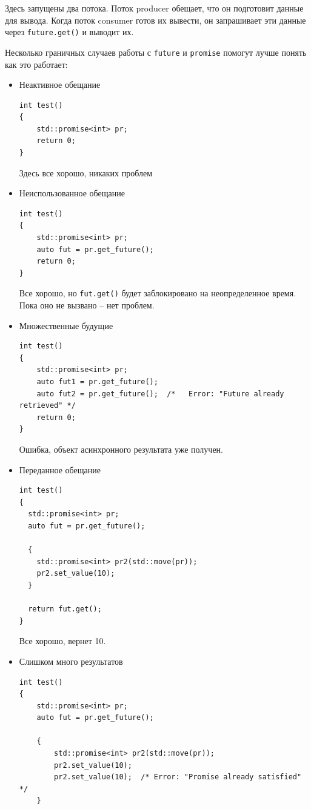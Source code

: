 \documentclass[a4paper,12pt,oneside]{article}
\begin{document}
Здесь запущены два потока. Поток producer обещает, что он подготовит данные для вывода. Когда поток consumer готов их вывести, он запрашивает эти данные через \lstinline!future.get()! и выводит их.

Несколько граничных случаев работы с \lstinline!future! и \lstinline!promise! помогут лучше понять как это работает:

\begin{itemize}
\item Неактивное обещание
\begin{lstlisting}
int test()
{
    std::promise<int> pr;
    return 0;
}
\end{lstlisting}

Здесь все хорошо, никаких проблем

\item Неиспользованное обещание
\begin{lstlisting}
int test()
{
    std::promise<int> pr;
    auto fut = pr.get_future();
    return 0;
}
\end{lstlisting}

Все хорошо, но \lstinline!fut.get()! будет заблокировано на неопределенное время. Пока оно не вызвано -- нет проблем.

\item Множественные будущие
\begin{lstlisting}
int test()
{
    std::promise<int> pr;
    auto fut1 = pr.get_future();
    auto fut2 = pr.get_future();  /*   Error: "Future already retrieved" */
    return 0;
}
\end{lstlisting}

Ошибка, объект асинхронного результата уже получен.

\item Переданное обещание
\begin{lstlisting}
int test()
{
  std::promise<int> pr;
  auto fut = pr.get_future();

  {
    std::promise<int> pr2(std::move(pr));
    pr2.set_value(10);
  }

  return fut.get();
}
\end{lstlisting}

Все хорошо, вернет 10.

\item Слишком много результатов
\begin{lstlisting}
int test()
{
    std::promise<int> pr;
    auto fut = pr.get_future();

    {
        std::promise<int> pr2(std::move(pr));
        pr2.set_value(10);
        pr2.set_value(10);  /* Error: "Promise already satisfied" */
    }


\end{lstlisting}
\end{itemize}
\end{document}
